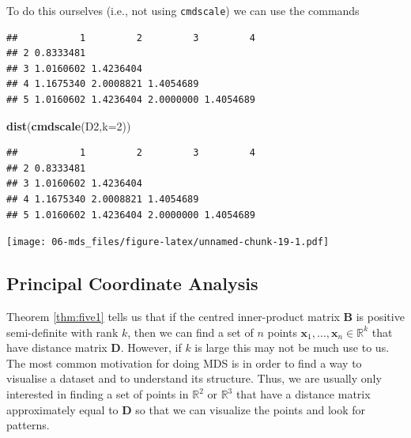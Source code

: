 \documentclass[
]{book}
\newenvironment{Shaded}{\begin{snugshade}}{\end{snugshade}}
\newcommand{\AttributeTok}[1]{\textcolor[rgb]{0.13,0.29,0.53}{#1}}
\newcommand{\DecValTok}[1]{\textcolor[rgb]{0.00,0.00,0.81}{#1}}
\newcommand{\FunctionTok}[1]{\textcolor[rgb]{0.13,0.29,0.53}{\textbf{#1}}}
\newcommand{\NormalTok}[1]{#1}
\newcommand{\OtherTok}[1]{\textcolor[rgb]{0.56,0.35,0.01}{#1}}
\newcommand{\SpecialCharTok}[1]{\textcolor[rgb]{0.81,0.36,0.00}{\textbf{#1}}}
\theoremstyle{definition}
\theoremstyle{definition}
\theoremstyle{definition}
\theoremstyle{definition}
\theoremstyle{remark}
\begin{document}
To do this ourselves (i.e., not using \texttt{cmdscale}) we can use the commands

\begin{Shaded}
\end{Shaded}

\begin{verbatim}
##           1         2         3         4
## 2 0.8333481                              
## 3 1.0160602 1.4236404                    
## 4 1.1675340 2.0008821 1.4054689          
## 5 1.0160602 1.4236404 2.0000000 1.4054689
\end{verbatim}

\begin{Shaded}
\begin{Highlighting}[]
\FunctionTok{dist}\NormalTok{(}\FunctionTok{cmdscale}\NormalTok{(D2,}\AttributeTok{k=}\DecValTok{2}\NormalTok{))}
\end{Highlighting}
\end{Shaded}

\begin{verbatim}
##           1         2         3         4
## 2 0.8333481                              
## 3 1.0160602 1.4236404                    
## 4 1.1675340 2.0008821 1.4054689          
## 5 1.0160602 1.4236404 2.0000000 1.4054689
\end{verbatim}

\texttt{[image: 06-mds\_files/figure-latex/unnamed-chunk-19-1.pdf]}

\hypertarget{principal-coordinate-analysis}{%
\subsection{Principal Coordinate Analysis}\label{principal-coordinate-analysis}}

Theorem \ref{thm:five1} tells us that if the centred inner-product matrix
\(\mathbf B\) is positive semi-definite with rank \(k\), then we can find a set of \(n\) points \(\mathbf x_1,\ldots, \mathbf x_n \in \mathbb{R}^k\) that have distance matrix \(\mathbf D\). However, if \(k\) is large this may not be much use to us. The most common motivation for doing MDS is in order to find a way to visualise a dataset and to understand its structure. Thus, we are usually only interested in finding a set of points in \(\mathbb{R}^2\) or \(\mathbb{R}^3\) that have a distance matrix approximately equal to \(\mathbf D\) so that we can visualize the points and look for patterns.
\end{document}
